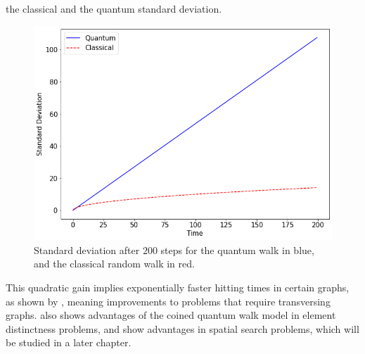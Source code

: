 \documentclass[../../dissertation.tex]{subfiles}
\begin{document}
the classical and the quantum standard deviation.
\begin{figure}[!h]
	\centering
	\includegraphics[scale=0.40]{img/CoinedQuantumWalk/coinedClassicalStdDev.png}
	\caption{Standard deviation after $200$ steps for the quantum walk in blue, and the classical random walk in red.} 
	\label{fig:coinedClassicalStdDev}
\end{figure}\par
This quadratic gain implies exponentially faster hitting times in certain
graphs, as shown by \cite{childs2002}, meaning improvements to problems that
require transversing graphs. \cite{ambainis2003} also shows advantages of the
coined quantum walk model in element distinctness problems, and
\cite{childs2004} show advantages in spatial search problems, which will be
studied in a later chapter.\par
\end{document}
